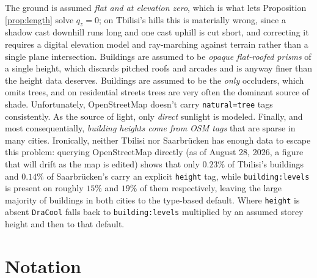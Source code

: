 \documentclass[11pt,a4paper]{article}
\theoremstyle{plain}
\theoremstyle{definition}
\theoremstyle{remark}
\begin{document}
The ground is assumed \emph{flat and at elevation zero}, which is what lets Proposition \ref{prop:length} solve $q_z = 0$; on Tbilisi's hills this is materially wrong, since a shadow cast downhill runs long and one cast uphill is cut short, and correcting it requires a digital elevation model and ray-marching against terrain rather than a single plane intersection. Buildings are assumed to be \emph{opaque flat-roofed prisms} of a single height, which discards pitched roofs and arcades and is anyway finer than the height data deserves. Buildings are assumed to be the \emph{only} occluders, which omits trees, and on residential streets trees are very often the dominant source of shade. Unfortunately, OpenStreetMap doesn't carry \texttt{natural=tree} tags consistently. As the source of light, only \emph{direct} sunlight is modeled. Finally, and most consequentially, \emph{building heights come from OSM tags} that are sparse in many cities. Ironically, neither Tbilisi nor Saarbr\"ucken has enough data to escape this problem: querying OpenStreetMap directly (as of August 28, 2026, a figure that will drift as the map is edited) shows that only $0.23\%$ of Tbilisi's buildings and $0.14\%$ of Saarbr\"ucken's carry an explicit \texttt{height} tag, while \texttt{building:levels} is present on roughly $15\%$ and $19\%$ of them respectively, leaving the large majority of buildings in both cities to the type-based default. Where \texttt{height} is absent \texttt{DraCool} falls back to \texttt{building:levels} multiplied by an assumed storey height and then to that default.

\section{Notation}
\label{sec:notation}
\end{document}
